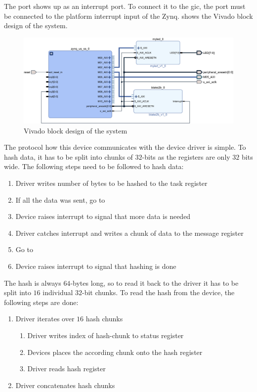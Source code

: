 The port shows up as an interrupt port.
To connect it to the \gls{gic}, the port must be connected to the platform interrupt input of the Zynq. 
 shows the Vivado block design of the system.

\begin{figure}[htbp]
    \centering
    \includegraphics[width=1\textwidth]{images/hw-design-system.png}
    \caption{\label{fig:hwsystem} Vivado block design of the system}
\end{figure}

The protocol how this device communicates with the device driver is simple.
To hash data, it has to be split into chunks of $32$-bits as the registers are
only $32$ bits wide.
The following steps need to be followed to hash data:
\begin{enumerate}
	\item Driver writes number of bytes to be hashed to the task register
	\item If all the data was sent, go to \label{item:check}
	\item Device raises interrupt to signal that more data is needed
	\item Driver catches interrupt and writes a chunk of data to the message
		register
	\item Go to 
	\item Device raises interrupt to signal that hashing is done\label{item:end}
\end{enumerate}
The hash is always $64$-bytes long, so to read it back to the driver it has to
be split into $16$ individual $32$-bit chunks.
To read the hash from the device, the following steps are done:
\begin{enumerate}
	\item Driver iterates over $16$ hash chunks
		\begin{enumerate}
			\item Driver writes index of hash-chunk to status register
			\item Devices places the according chunk onto the hash register
			\item Driver reads hash register
		\end{enumerate}
	\item Driver concatenates hash chunks
\end{enumerate}
